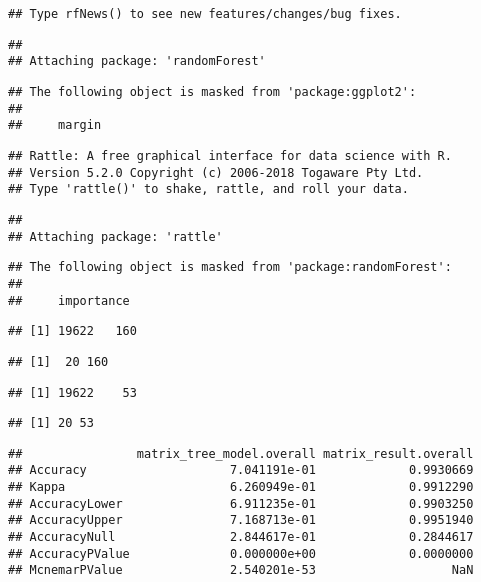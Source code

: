 \documentclass[]{article}
\begin{document}
\begin{verbatim}
## Type rfNews() to see new features/changes/bug fixes.
\end{verbatim}

\begin{verbatim}
## 
## Attaching package: 'randomForest'
\end{verbatim}

\begin{verbatim}
## The following object is masked from 'package:ggplot2':
## 
##     margin
\end{verbatim}

\begin{verbatim}
## Rattle: A free graphical interface for data science with R.
## Version 5.2.0 Copyright (c) 2006-2018 Togaware Pty Ltd.
## Type 'rattle()' to shake, rattle, and roll your data.
\end{verbatim}

\begin{verbatim}
## 
## Attaching package: 'rattle'
\end{verbatim}

\begin{verbatim}
## The following object is masked from 'package:randomForest':
## 
##     importance
\end{verbatim}

\begin{verbatim}
## [1] 19622   160
\end{verbatim}

\begin{verbatim}
## [1]  20 160
\end{verbatim}

\begin{verbatim}
## [1] 19622    53
\end{verbatim}

\begin{verbatim}
## [1] 20 53
\end{verbatim}

\begin{verbatim}
##                matrix_tree_model.overall matrix_result.overall
## Accuracy                    7.041191e-01             0.9930669
## Kappa                       6.260949e-01             0.9912290
## AccuracyLower               6.911235e-01             0.9903250
## AccuracyUpper               7.168713e-01             0.9951940
## AccuracyNull                2.844617e-01             0.2844617
## AccuracyPValue              0.000000e+00             0.0000000
## McnemarPValue               2.540201e-53                   NaN
\end{verbatim}
\end{document}
